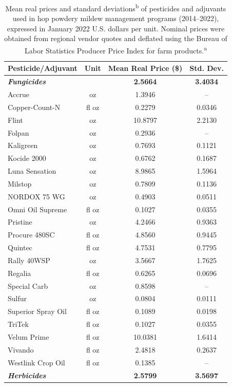 \begin{table}[ht]
\centering
\caption{Mean real prices and standard deviations\textsuperscript{b} of pesticides and adjuvants used in hop powdery mildew management programs (2014--2022), expressed in January 2022 U.S. dollars per unit. Nominal prices were obtained from regional vendor quotes and deflated using the Bureau of Labor Statistics Producer Price Index for farm products.\textsuperscript{a}}
\label{tab:S2_pesticides}
\footnotesize
\setlength{\tabcolsep}{4pt}
\begin{tabular}{lccc}
\hline
\textbf{Pesticide/Adjuvant} & \textbf{Unit} & \textbf{Mean Real Price (\$)} & \textbf{Std. Dev.} \\
\hline
\textbf{\textit{Fungicides}} & & \textbf{2.5664} & \textbf{3.4034} \\
\hline
Accrue & oz & 1.3946 & -- \\
Copper-Count-N & fl oz & 0.2279 & 0.0346 \\
Flint & oz & 10.8797 & 2.2130 \\
Folpan & oz & 0.2936 & -- \\
Kaligreen & oz & 0.7693 & 0.1121 \\
Kocide 2000 & oz & 0.6762 & 0.1687 \\
Luna Sensation & oz & 8.9865 & 1.5964 \\
Milstop & oz & 0.7809 & 0.1136 \\
NORDOX 75 WG & oz & 0.4903 & 0.0511 \\
Omni Oil Supreme & fl oz & 0.1027 & 0.0355 \\
Pristine & oz & 4.2466 & 0.9363 \\
Procure 480SC & fl oz & 4.8560 & 0.9445 \\
Quintec & fl oz & 4.7531 & 0.7795 \\
Rally 40WSP & oz & 3.5667 & 1.7625 \\
Regalia & fl oz & 0.6265 & 0.0696 \\
Special Carb & oz & 0.8598 & -- \\
Sulfur & oz & 0.0804 & 0.0111 \\
Superior Spray Oil & fl oz & 0.1089 & 0.0198 \\
TriTek & fl oz & 0.1027 & 0.0355 \\
Velum Prime & fl oz & 10.0381 & 1.6414 \\
Vivando & fl oz & 2.4818 & 0.2637 \\
Westlink Crop Oil & fl oz & 0.1385 & -- \\
\hline
\textbf{\textit{Herbicides}} & & \textbf{2.5799} & \textbf{3.5697} \\

\end{tabular}
\end{table}

